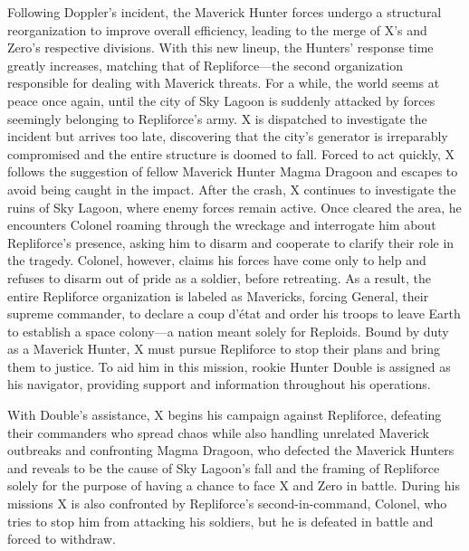 Following Doppler's incident, the Maverick Hunter forces undergo a structural reorganization to improve overall efficiency, leading to the merge of X’s and Zero’s respective divisions. With this new lineup, the Hunters’ response time greatly increases, matching that of Repliforce—the second organization responsible for dealing with Maverick threats. For a while, the world seems at peace once again, until the city of Sky Lagoon is suddenly attacked by forces seemingly belonging to Repliforce’s army. X is dispatched to investigate the incident but arrives too late, discovering that the city’s generator is irreparably compromised and the entire structure is doomed to fall. Forced to act quickly, X follows the suggestion of fellow Maverick Hunter Magma Dragoon and escapes to avoid being caught in the impact. After the crash, X continues to investigate the ruins of Sky Lagoon, where enemy forces remain active. Once cleared the area, he encounters Colonel roaming through the wreckage and interrogate him about Repliforce’s presence, asking him to disarm and cooperate to clarify their role in the tragedy. Colonel, however, claims his forces have come only to help and refuses to disarm out of pride as a soldier, before retreating. As a result, the entire Repliforce organization is labeled as Mavericks, forcing General, their supreme commander, to declare a coup d’état and order his troops to leave Earth to establish a space colony—a nation meant solely for Reploids. Bound by duty as a Maverick Hunter, X must pursue Repliforce to stop their plans and bring them to justice. To aid him in this mission, rookie Hunter Double is assigned as his navigator, providing support and information throughout his operations.

With Double’s assistance, X begins his campaign against Repliforce, defeating their commanders who spread chaos while also handling unrelated Maverick outbreaks and confronting Magma Dragoon, who defected the Maverick Hunters and reveals to be the cause of Sky Lagoon’s fall and the  framing of Repliforce solely for the purpose of having a chance to face X and Zero in battle. During his missions X is also confronted  by Repliforce’s second-in-command, Colonel, who tries to stop him from attacking his soldiers, but he is defeated in battle and forced to withdraw. 

